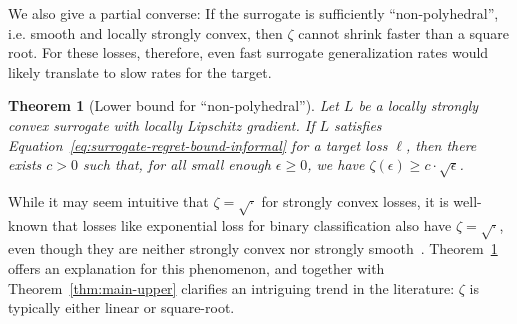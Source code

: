 \documentclass{article}
\newtheorem{theorem}{Theorem}
\theoremstyle{definition}\newtheorem{definition}{Definition}
\theoremstyle{definition}\newtheorem{assumption}{Assumption}
\begin{document}
We also give a partial converse: If the surrogate is sufficiently ``non-polyhedral'', i.e. smooth and locally strongly convex, then $\zeta$ cannot shrink faster than a square root.
For these losses, therefore, even fast surrogate generalization rates would likely translate to slow rates for the target.
\begin{theorem}[Lower bound for ``non-polyhedral'']
  \label{thm:main-lower}
  Let $L$ be a locally strongly convex surrogate with locally Lipschitz gradient.
  If $L$ satisfies Equation~\ref{eq:surrogate-regret-bound-informal} for a target loss $\ell$, then there exists $c>0$ such that, for all small enough $\epsilon \geq 0$, we have $\zeta(\epsilon) \geq c\cdot\sqrt{\epsilon}$.
\end{theorem}
While it may seem intuitive that $\zeta=\sqrt{\cdot}$ for strongly convex losses, it is well-known that losses like exponential loss for binary classification also have $\zeta=\sqrt{\cdot}$, even though they are neither strongly convex nor strongly smooth~\cite{bartlett2006convexity}.
Theorem~\ref{thm:main-lower} offers an explanation for this phenomenon, and together with Theorem~\ref{thm:main-upper} clarifies an intriguing trend in the literature: $\zeta$ is typically either linear or square-root.
\end{document}
